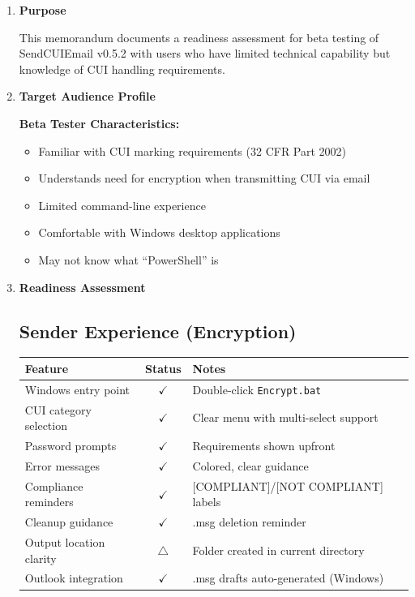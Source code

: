 \documentclass[11pt,letterpaper]{article}
\newcommand{\dmsection}[1]{\item \textbf{#1}\par}
\begin{document}
\begin{enumerate}

\dmsection{Purpose}

This memorandum documents a readiness assessment for beta testing of SendCUIEmail v0.5.2 with users who have limited technical capability but knowledge of CUI handling requirements.

\dmsection{Target Audience Profile}

\textbf{Beta Tester Characteristics:}
\begin{itemize}
    \item Familiar with CUI marking requirements (32 CFR Part 2002)
    \item Understands need for encryption when transmitting CUI via email
    \item Limited command-line experience
    \item Comfortable with Windows desktop applications
    \item May not know what ``PowerShell'' is
\end{itemize}

\dmsection{Readiness Assessment}

\subsection*{Sender Experience (Encryption)}

\begin{tabularx}{\textwidth}{|l|c|X|}
\hline
\textbf{Feature} & \textbf{Status} & \textbf{Notes} \\
\hline
Windows entry point & \textcolor{passgreen}{$\checkmark$} & Double-click \texttt{Encrypt.bat} \\
\hline
CUI category selection & \textcolor{passgreen}{$\checkmark$} & Clear menu with multi-select support \\
\hline
Password prompts & \textcolor{passgreen}{$\checkmark$} & Requirements shown upfront \\
\hline
Error messages & \textcolor{passgreen}{$\checkmark$} & Colored, clear guidance \\
\hline
Compliance reminders & \textcolor{passgreen}{$\checkmark$} & [COMPLIANT]/[NOT COMPLIANT] labels \\
\hline
Cleanup guidance & \textcolor{passgreen}{$\checkmark$} & .msg deletion reminder \\
\hline
Output location clarity & \textcolor{warncolor}{$\triangle$} & Folder created in current directory \\
\hline
Outlook integration & \textcolor{passgreen}{$\checkmark$} & .msg drafts auto-generated (Windows) \\
\hline
\end{tabularx}


\end{enumerate}
\end{document}
